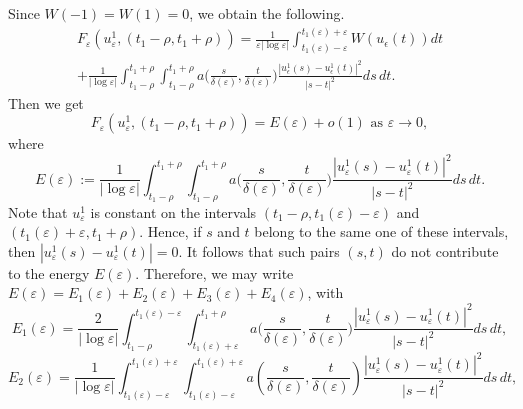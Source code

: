 \documentclass[12pt]{article}
\numberwithin{equation}{section}
\def\e{\varepsilon}
\begin{document}
Since $W(-1)=W(1)=0$, we obtain the following.
\begin{align*}
    F_{\varepsilon}(u^{1}_{\varepsilon},(t_{1}-\rho,t_{1}+\rho))=\frac{1}{\varepsilon|\log{\varepsilon}|}\int_{t_{1}(\varepsilon)-\varepsilon}^{t_{1}(\varepsilon)+\varepsilon}W(u_{\epsilon}(t))dt\\+\frac{1}{|\log\varepsilon|}\int_{t_{1}-\rho}^{t_{1}+\rho}\int_{t_{1}-\rho}^{t_{1}+\rho}a\Big(\frac{s}{\delta(\varepsilon)},\frac{t}{\delta(\varepsilon)}\Big)\frac{\left|u^{1}_{\epsilon}(s)-u^{1}_{\epsilon}(t)\right|^2}{\left|s-t\right|^2}ds\,dt.
\end{align*}
Then we get 
\begin{equation*}
    F_{\varepsilon}(u^{1}_{\varepsilon},(t_{1}-\rho,t_{1}+\rho))=E({\varepsilon})+o(1)\,\,\text{as}\,\,\varepsilon\to0,
\end{equation*}
where 
\begin{equation}
    E({\varepsilon}):=\frac{1}{|\log\varepsilon|}\int_{t_{1}-\rho}^{t_{1}+\rho}\int_{t_{1}-\rho}^{t_{1}+\rho}a\Big(\frac{s}{\delta(\varepsilon)},\frac{t}{\delta(\varepsilon)}\Big)\frac{\left|u^{1}_{\varepsilon}(s)-u^{1}_{\varepsilon}(t)\right|^2}{\left|s-t\right|^2}ds\,dt.
\end{equation}
Note that \(u_\varepsilon^1\) is constant on the intervals $(t_1-\rho,t_1(\varepsilon)-\e)$ and
$(t_1(\varepsilon)+\varepsilon,t_1+\rho)$.
Hence, if \(s\) and \(t\) belong to the same one of these intervals, then $|u_\varepsilon^1(s)-u_\varepsilon^1(t)|=0$. It follows that such pairs \((s,t)\) do not contribute to the energy \(E(\varepsilon)\). Therefore, we may write
$   E({\varepsilon})=E_{1}(\varepsilon)+E_{2}(\varepsilon)+E_{3}(\varepsilon)+E_{4}(\varepsilon)$,
with 
\begin{equation*}
    E_{1}(\varepsilon)=\frac{2}{|\log\varepsilon|}\int_{t_{1}-\rho}^{t_{1}(\varepsilon)-\varepsilon}\int_{t_{1}(\varepsilon)+\varepsilon}^{t_{1}+\rho}a\Big(\frac{s}{\delta(\varepsilon)},\frac{t}{\delta(\varepsilon)}\Big)\frac{\left|u^{1}_{\varepsilon}(s)-u^{1}_{\varepsilon}(t)\right|^2}{\left|s-t\right|^2}ds\,dt,
\end{equation*}
\begin{equation*}
    E_{2}(\varepsilon)=\frac{1}{|\log\varepsilon|}\int_{t_{1}(\varepsilon)-\varepsilon}^{t_{1}(\varepsilon)+\varepsilon}\int_{t_{1}(\varepsilon)-\varepsilon}^{t_{1}(\varepsilon)+\varepsilon}a\left(\frac{s}{\delta(\varepsilon)},\frac{t}{\delta(\varepsilon)}\right)\frac{\left|u^{1}_{\varepsilon}(s)-u^{1}_{\varepsilon}(t)\right|^2}{\left|s-t\right|^2}ds\,dt,
\end{equation*}
\end{document}
